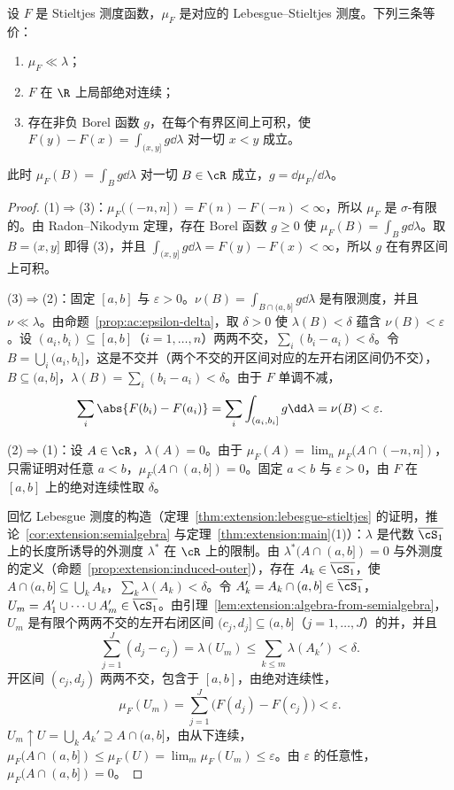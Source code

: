 \begin{theorem}\label{thm:ac:stieltjes-ac}
设 $F$ 是 Stieltjes 测度函数，$\mu_F$ 是对应的 Lebesgue--Stieltjes 测度。下列三条等价：
\begin{enumerate}
\item $\mu_F\ll\lambda$；
\item $F$ 在 $\R$ 上局部绝对连续；
\item 存在非负 Borel 函数 $g$，在每个有界区间上可积，使 $F(y)-F(x)=\int_{(x,y]}g\dd\lambda$ 对一切 $x<y$ 成立。
\end{enumerate}
此时 $\mu_F(B)=\int_Bg\dd\lambda$ 对一切 $B\in\cR$ 成立，$g=\dd\mu_F/\dd\lambda$。
\end{theorem}
\begin{proof}
(1)$\Rightarrow$(3)：$\mu_F((-n,n])=F(n)-F(-n)<\infty$，所以 $\mu_F$ 是 $\sigma$-有限的。由 Radon--Nikodym 定理，存在 Borel 函数 $g\geqslant0$ 使 $\mu_F(B)=\int_Bg\dd\lambda$。取 $B=(x,y]$ 即得 (3)，并且 $\int_{(x,y]}g\dd\lambda=F(y)-F(x)<\infty$，所以 $g$ 在有界区间上可积。

(3)$\Rightarrow$(2)：固定 $[a,b]$ 与 $\varepsilon>0$。$\nu(B)=\int_{B\cap(a,b]}g\dd\lambda$ 是有限测度，并且 $\nu\ll\lambda$。由命题~\ref{prop:ac:epsilon-delta}，取 $\delta>0$ 使 $\lambda(B)<\delta$ 蕴含 $\nu(B)<\varepsilon$。设 $(a_i,b_i)\subseteq[a,b]$（$i=1,\dots,n$）两两不交，$\sum_i(b_i-a_i)<\delta$。令 $B=\bigcup_i(a_i,b_i]$，这是不交并（两个不交的开区间对应的左开右闭区间仍不交），$B\subseteq(a,b]$，$\lambda(B)=\sum_i(b_i-a_i)<\delta$。由于 $F$ 单调不减，
\[
\sum_i\abs{F(b_i)-F(a_i)}=\sum_i\int_{(a_i,b_i]}g\dd\lambda=\nu(B)<\varepsilon .
\]

(2)$\Rightarrow$(1)：设 $A\in\cR$，$\lambda(A)=0$。由于 $\mu_F(A)=\lim_n\mu_F(A\cap(-n,n])$，只需证明对任意 $a<b$，$\mu_F(A\cap(a,b])=0$。固定 $a<b$ 与 $\varepsilon>0$，由 $F$ 在 $[a,b]$ 上的绝对连续性取 $\delta$。

回忆 Lebesgue 测度的构造（定理~\ref{thm:extension:lebesgue-stieltjes} 的证明，推论~\ref{cor:extension:semialgebra} 与定理~\ref{thm:extension:main}(1)）：$\lambda$ 是代数 $\overline{\cS_1}$ 上的长度所诱导的外测度 $\lambda^*$ 在 $\cR$ 上的限制。由 $\lambda^*(A\cap(a,b])=0$ 与外测度的定义（命题~\ref{prop:extension:induced-outer}），存在 $A_k\in\overline{\cS_1}$，使 $A\cap(a,b]\subseteq\bigcup_kA_k$，$\sum_k\lambda(A_k)<\delta$。令 $A_k'=A_k\cap(a,b]\in\overline{\cS_1}$，$U_m=A_1'\cup\cdots\cup A_m'\in\overline{\cS_1}$。由引理~\ref{lem:extension:algebra-from-semialgebra}，$U_m$ 是有限个两两不交的左开右闭区间 $(c_j,d_j]\subseteq(a,b]$（$j=1,\dots,J$）的并，并且
\[
\sum_{j=1}^J(d_j-c_j)=\lambda(U_m)\leqslant\sum_{k\leqslant m}\lambda(A_k')<\delta .
\]
开区间 $(c_j,d_j)$ 两两不交，包含于 $[a,b]$，由绝对连续性，
\[
\mu_F(U_m)=\sum_{j=1}^J\bigl(F(d_j)-F(c_j)\bigr)<\varepsilon .
\]
$U_m\uparrow U=\bigcup_kA_k'\supseteq A\cap(a,b]$，由从下连续，$\mu_F(A\cap(a,b])\leqslant\mu_F(U)=\lim_m\mu_F(U_m)\leqslant\varepsilon$。由 $\varepsilon$ 的任意性，$\mu_F(A\cap(a,b])=0$。


\end{proof}
